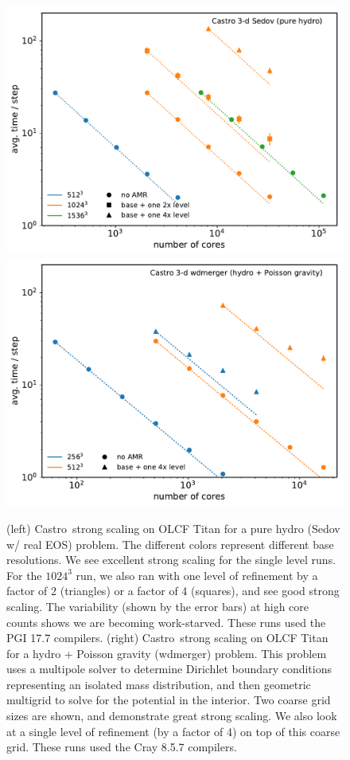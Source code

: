 \documentclass[a4paper]{jpconf}
\newcommand{\castro}{{\sffamily Castro}}
\begin{document}
\begin{figure}[t]
\centering
\includegraphics[width=0.48\linewidth]{sedov_scaling}
\includegraphics[width=0.48\linewidth]{wdmerger_scaling}
\caption{\label{fig:castro-scaling} (left) \castro\ strong scaling on
  OLCF Titan for a pure hydro (Sedov w/ real EOS) problem.  The
  different colors represent different base resolutions.  We see
  excellent strong scaling for the single level runs.  For the
  $1024^3$ run, we also ran with one level of refinement by a factor
  of 2 (triangles) or a factor of 4 (squares), and see good strong
  scaling.  The variability (shown by the error bars) at high core
  counts shows we are becoming work-starved.  These runs used the PGI 17.7
  compilers.  (right) \castro\ strong
  scaling on OLCF Titan for a hydro + Poisson gravity (wdmerger)
  problem.  This problem uses a multipole solver to determine
  Dirichlet boundary conditions representing an isolated mass
  distribution, and then geometric multigrid to solve for the
  potential in the interior.  Two coarse grid sizes are shown, and
  demonstrate great strong scaling.  We also look at a single level of
  refinement (by a factor of 4) on top of this coarse grid.  These runs 
  used the Cray 8.5.7 compilers.}
\end{figure}
\end{document}
